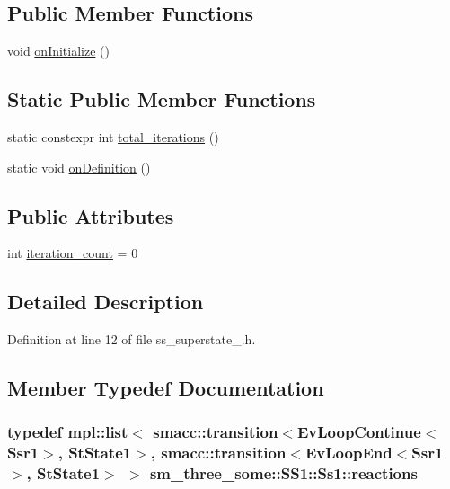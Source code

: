 \subsection*{Public Member Functions}
\begin{DoxyCompactItemize}
\item 
void \hyperlink{structsm__three__some_1_1SS1_1_1Ss1_a5fa4f5f30156372352630a619fac4778}{on\+Initialize} ()
\end{DoxyCompactItemize}
\subsection*{Static Public Member Functions}
\begin{DoxyCompactItemize}
\item 
static constexpr int \hyperlink{structsm__three__some_1_1SS1_1_1Ss1_a02f44c29d4ebf2615b66a0783ee668e4}{total\+\_\+iterations} ()
\item 
static void \hyperlink{structsm__three__some_1_1SS1_1_1Ss1_aeac7f375b7b0d430f4abf802cef0c87a}{on\+Definition} ()
\end{DoxyCompactItemize}
\subsection*{Public Attributes}
\begin{DoxyCompactItemize}
\item 
int \hyperlink{structsm__three__some_1_1SS1_1_1Ss1_a775d2050e53513d711b041238b5c11ff}{iteration\+\_\+count} = 0
\end{DoxyCompactItemize}


\subsection{Detailed Description}


Definition at line 12 of file ss\+\_\+superstate\+\_.\+h.



\subsection{Member Typedef Documentation}
\subsubsection[{\texorpdfstring{reactions}{reactions}}]{\setlength{\rightskip}{0pt plus 5cm}typedef mpl\+::list$<$ {\bf smacc\+::transition}$<$Ev\+Loop\+Continue$<${\bf Ssr1}$>$, {\bf St\+State1}$>$, {\bf smacc\+::transition}$<$Ev\+Loop\+End$<${\bf Ssr1}$>$, {\bf St\+State1}$>$ $>$ {\bf sm\+\_\+three\+\_\+some\+::\+S\+S1\+::\+Ss1\+::reactions}}\hypertarget{structsm__three__some_1_1SS1_1_1Ss1_afe5ddf0e92947dde03a8432c6076f12a}{}\label{structsm__three__some_1_1SS1_1_1Ss1_afe5ddf0e92947dde03a8432c6076f12a}


